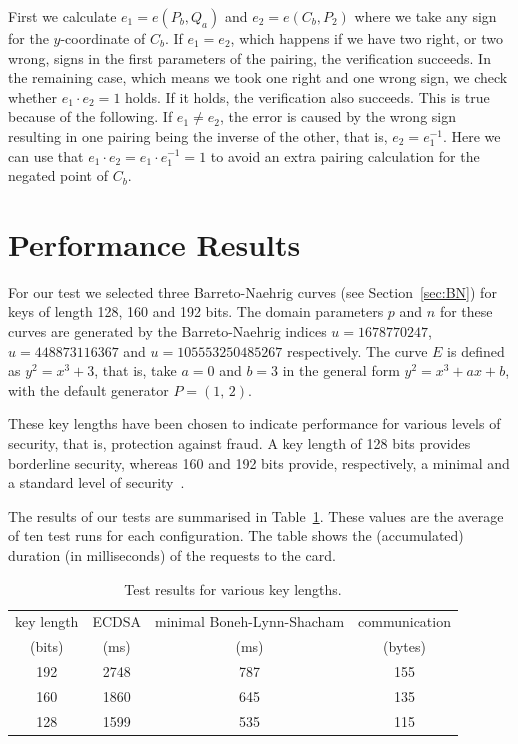 First we calculate $e_1 = e(P_b, Q_a)$ and $e_2 = e(C_b, P_2)$ where we take
any sign for the $y$-coordinate of $C_b$. If $e_1 = e_2$, which happens if we
have two right, or two wrong, signs in the first parameters of the pairing, the
verification succeeds. In the remaining case, which means we took one right and
one wrong sign, we check whether $e_1 \cdot e_2 = 1$ holds. If it holds, the
verification also succeeds. This is true because of the following. If
$e_1 \neq e_2$, the error is caused by the wrong sign resulting in one pairing
being the inverse of the other, that is, $e_2 = e_1^{-1}$. Here we can use that
$e_1 \cdot e_2 = e_1 \cdot e_1^{-1} = 1$ to avoid an extra pairing calculation
for the negated point of $C_b$.

\section{Performance Results}

For our test we selected three Barreto-Naehrig curves (see Section~\ref{sec:BN}) for keys of length 128,
160 and 192 bits. The domain parameters $p$ and $n$ for these curves are
generated by the Barreto-Naehrig indices $u=1678770247$, $u=448873116367$ and
$u=105553250485267$ respectively. The curve $E$ is
defined as $y^2 = x^3 + 3$, that is, take $a = 0$ and $b = 3$ in the general
form $y^2 = x^3 + ax + b$, with the default generator $P = (1,\, 2)$.

These key lengths have been chosen to indicate performance for various levels of
security, that is, protection against fraud. A key length of 128 bits provides
borderline security, whereas 160 and 192 bits provide, respectively, a minimal
and a standard level of security~\cite{Ecrypt}.

The results of our tests are summarised in Table~\ref{tab:sbc-results}. These
values are the average of ten test runs for each configuration. The table shows
the (accumulated) duration (in milliseconds) of the requests to the card.

\begin{table}[ht]
  \centering
  \caption{Test results for various key lengths.}
  \label{tab:sbc-results}
  \renewcommand{\tabcolsep}{1.25mm}
  \renewcommand{\arraystretch}{1.25}
  \begin{tabular}{| c || c | c || c |}\hline
    key length & ECDSA & minimal Boneh-Lynn-Shacham & communication \\
    (bits) & (ms) & (ms) & (bytes) \\\hline\hline
    192 & 2748 & 787 & 155 \\\hline
    160 & 1860 & 645 & 135 \\\hline
    128 & 1599 & 535 & 115 \\\hline
  \end{tabular}
\end{table}

